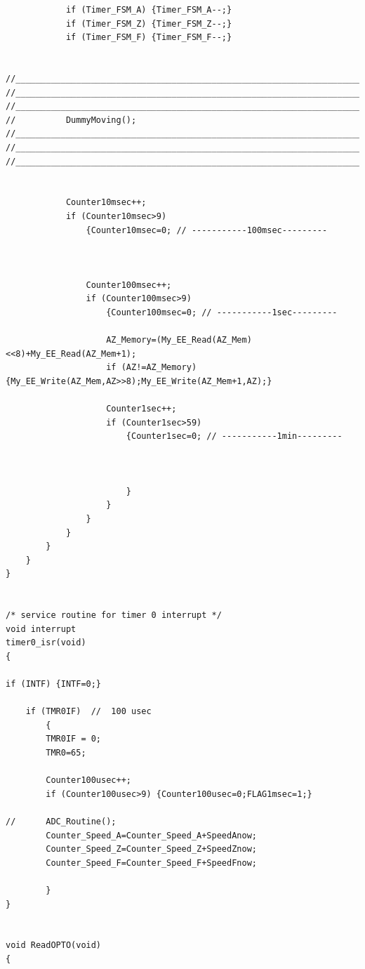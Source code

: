 \documentclass[
  a4paper,
  twoside,
  titlepage,
  12pt]{article}
\numberwithin{equation}{section}
\numberwithin{figure}{section}
\numberwithin{table}{section}
\begin{document}
\begin{verbatim}
            if (Timer_FSM_A) {Timer_FSM_A--;}
            if (Timer_FSM_Z) {Timer_FSM_Z--;}
            if (Timer_FSM_F) {Timer_FSM_F--;}


//_____________________________________________________________________________________________
//_____________________________________________________________________________________________
//_____________________________________________________________________________________________
//          DummyMoving();
//_____________________________________________________________________________________________
//_____________________________________________________________________________________________
//_____________________________________________________________________________________________


            Counter10msec++;
            if (Counter10msec>9) 
                {Counter10msec=0; // -----------100msec---------            
            


                Counter100msec++;
                if (Counter100msec>9) 
                    {Counter100msec=0; // -----------1sec---------

                    AZ_Memory=(My_EE_Read(AZ_Mem)<<8)+My_EE_Read(AZ_Mem+1);
                    if (AZ!=AZ_Memory) {My_EE_Write(AZ_Mem,AZ>>8);My_EE_Write(AZ_Mem+1,AZ);}    
    
                    Counter1sec++;
                    if (Counter1sec>59) 
                        {Counter1sec=0; // -----------1min---------
                            


                        }
                    }
                }
            }           
        }
    }
}


/* service routine for timer 0 interrupt */
void interrupt
timer0_isr(void)
{

if (INTF) {INTF=0;}

    if (TMR0IF)  //  100 usec
        {
        TMR0IF = 0;
        TMR0=65;

        Counter100usec++;
        if (Counter100usec>9) {Counter100usec=0;FLAG1msec=1;}

//      ADC_Routine();
        Counter_Speed_A=Counter_Speed_A+SpeedAnow;
        Counter_Speed_Z=Counter_Speed_Z+SpeedZnow;
        Counter_Speed_F=Counter_Speed_F+SpeedFnow;

        }
}


void ReadOPTO(void)
{


\end{verbatim}
\end{document}

